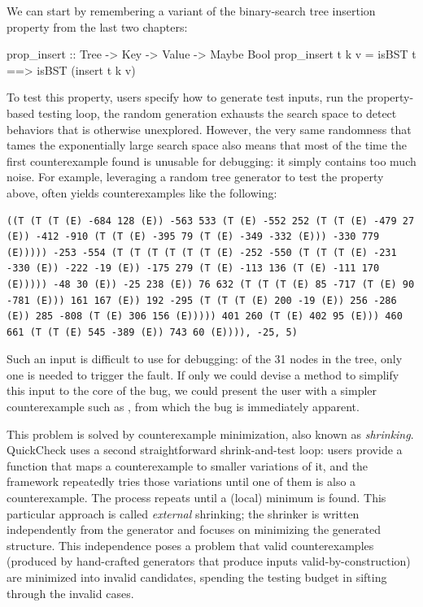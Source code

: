We can start by remembering a variant of the binary-search tree insertion property from
the last two chapters:

\begin{code}[language=Haskell]
		prop_insert :: Tree -> Key -> Value -> Maybe Bool
		prop_insert t k v = isBST t ==> isBST (insert t k v)
\end{code}

To test this property, users specify how to generate test inputs, run the
property-based testing loop, the random generation exhausts the search space to detect
behaviors that is otherwise unexplored. However, the very same randomness that tames
the exponentially large search space also means that most of the time the first
counterexample found is unusable for debugging: it simply contains too much noise. For
example, leveraging a random tree generator to test the
 property above, often yields counterexamples like
the following:

\begin{lstlisting}[basicstyle=\ttfamily\scriptsize, breaklines=true,
	breakatwhitespace=true, breakautoindent=false, breakindent=0pt,
	columns=fullflexible, xleftmargin=1.2em,
	aboveskip=0.8em, belowskip=0.8em]
((T (T (T (E) -684 128 (E)) -563 533 (T (E) -552 252 (T (T (E) -479 27 (E)) -412 -910 (T (T (E) -395 79 (T (E) -349 -332 (E))) -330 779 (E))))) -253 -554 (T (T (T (T (T (T (E) -252 -550 (T (T (T (E) -231 -330 (E)) -222 -19 (E)) -175 279 (T (E) -113 136 (T (E) -111 170 (E))))) -48 30 (E)) -25 238 (E)) 76 632 (T (T (T (E) 85 -717 (T (E) 90 -781 (E))) 161 167 (E)) 192 -295 (T (T (T (E) 200 -19 (E)) 256 -286 (E)) 285 -808 (T (E) 306 156 (E))))) 401 260 (T (E) 402 95 (E))) 460 661 (T (T (E) 545 -389 (E)) 743 60 (E)))), -25, 5)
\end{lstlisting}

\noindent Such an input is difficult to use for debugging: of the 31
nodes in the tree, only one is needed to trigger the fault. If only we
could devise a method to simplify this input to the core of the bug, we
could present the user with a simpler counterexample such as
, from which the bug is immediately
apparent.

This problem is solved by counterexample minimization, also known as {\em shrinking}.
QuickCheck uses a second straightforward shrink-and-test loop: users provide a function
that maps a counterexample to smaller variations of it, and the framework repeatedly
tries those variations until one of them is also a counterexample. The process repeats
until a (local) minimum is found. This particular approach is called {\em external}
shrinking; the shrinker is written independently from the generator and focuses on
minimizing the generated structure. This independence poses a problem that valid
counterexamples (produced by hand-crafted generators that produce inputs
valid-by-construction) are minimized into invalid candidates, spending the testing
budget in sifting through the invalid cases.

